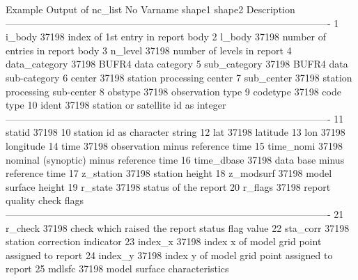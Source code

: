 \begin{codeonlysmall}{Example Output of nc\_list}
No   Varname                       shape1     shape2  Description                   
----------------------------------------------------------------------------------------------------
1    i_body                         37198             index of 1st entry in report body
2    l_body                         37198             number of entries in report body
3    n_level                        37198             number of levels in report    
4    data_category                  37198             BUFR4 data category           
5    sub_category                   37198             BUFR4 data sub-category       
6    center                         37198             station processing center     
7    sub_center                     37198             station processing sub-center 
8    obstype                        37198             observation type              
9    codetype                       37198             code type                     
10   ident                          37198             station or satellite id as integer
----------------------------------------------------------------------------------------------------
11   statid                         37198         10  station id as character string
12   lat                            37198             latitude                      
13   lon                            37198             longitude                     
14   time                           37198             observation minus reference time
15   time_nomi                      37198             nominal (synoptic) minus reference time
16   time_dbase                     37198             data base minus reference time
17   z_station                      37198             station height                
18   z_modsurf                      37198             model surface height          
19   r_state                        37198             status of the report          
20   r_flags                        37198             report quality check flags    
----------------------------------------------------------------------------------------------------
21   r_check                        37198             check which raised the report status flag value
22   sta_corr                       37198             station correction indicator  
23   index_x                        37198             index x of model grid point assigned to report
24   index_y                        37198             index y of model grid point assigned to report
25   mdlsfc                         37198             model surface characteristics 

\end{codeonlysmall}
